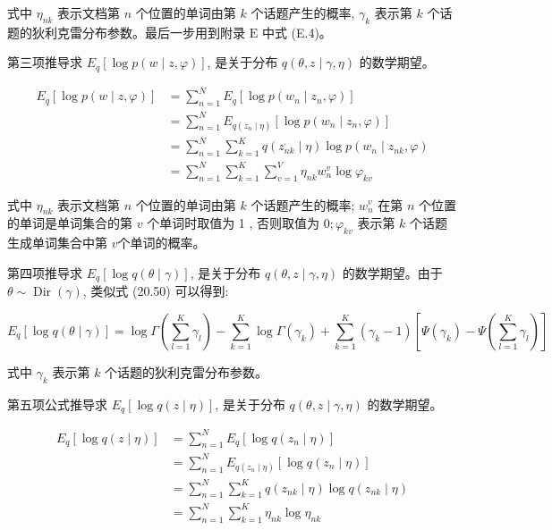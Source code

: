 \documentclass[10pt]{article}
\begin{document}
\begin{CJK*}{UTF8}{bsmi}
式中 $\eta_{n k}$ 表示文档第 $n$ 个位置的单词由第 $k$ 个话题产生的概率, $\gamma_{k}$ 表示第 $k$ 个话题的狄利克雷分布参数。最后一步用到附录 $\mathrm{E}$ 中式 (E.4)。

第三项推导求 $E_{q}[\log p(w \mid z, \varphi)]$, 是关于分布 $q(\theta, z \mid \gamma, \eta)$ 的数学期望。


\begin{align*}
E_{q}[\log p(w \mid z, \varphi)] & =\sum_{n=1}^{N} E_{q}\left[\log p\left(w_{n} \mid z_{n}, \varphi\right)\right] \\
& =\sum_{n=1}^{N} E_{q\left(z_{n} \mid \eta\right)}\left[\log p\left(w_{n} \mid z_{n}, \varphi\right)\right] \\
& =\sum_{n=1}^{N} \sum_{k=1}^{K} q\left(z_{n k} \mid \eta\right) \log p\left(w_{n} \mid z_{n k}, \varphi\right) \\
& =\sum_{n=1}^{N} \sum_{k=1}^{K} \sum_{v=1}^{V} \eta_{n k} w_{n}^{v} \log \varphi_{k v} \tag{20.53}
\end{align*}


式中 $\eta_{n k}$ 表示文档第 $n$ 个位置的单词由第 $k$ 个话题产生的概率; $w_{n}^{v}$ 在第 $n$ 个位置的单词是单词集合的第 $v$ 个单词时取值为 1 , 否则取值为 $0 ; \varphi_{k v}$ 表示第 $k$ 个话题生成单词集合中第 $v$个单词的概率。

第四项推导求 $E_{q}[\log q(\theta \mid \gamma)]$, 是关于分布 $q(\theta, z \mid \gamma, \eta)$ 的数学期望。由于 $\theta \sim \operatorname{Dir}(\gamma)$, 类似式 (20.50) 可以得到:


\begin{equation*}
E_{q}[\log q(\theta \mid \gamma)]=\log \Gamma\left(\sum_{l=1}^{K} \gamma_{l}\right)-\sum_{k=1}^{K} \log \Gamma\left(\gamma_{k}\right)+\sum_{k=1}^{K}\left(\gamma_{k}-1\right)\left[\Psi\left(\gamma_{k}\right)-\Psi\left(\sum_{l=1}^{K} \gamma_{l}\right)\right] \tag{20.54}
\end{equation*}


式中 $\gamma_{k}$ 表示第 $k$ 个话题的狄利克雷分布参数。

第五项公式推导求 $E_{q}[\log q(z \mid \eta)]$, 是关于分布 $q(\theta, z \mid \gamma, \eta)$ 的数学期望。


\begin{align*}
E_{q}[\log q(z \mid \eta)] & =\sum_{n=1}^{N} E_{q}\left[\log q\left(z_{n} \mid \eta\right)\right] \\
& =\sum_{n=1}^{N} E_{q\left(z_{n} \mid \eta\right)}\left[\log q\left(z_{n} \mid \eta\right)\right] \\
& =\sum_{n=1}^{N} \sum_{k=1}^{K} q\left(z_{n k} \mid \eta\right) \log q\left(z_{n k} \mid \eta\right) \\
& =\sum_{n=1}^{N} \sum_{k=1}^{K} \eta_{n k} \log \eta_{n k} \tag{20.55}
\end{align*}



\end{CJK*}
\end{document}
